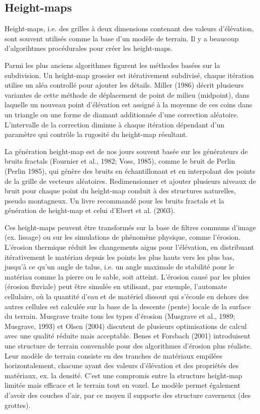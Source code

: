 \documentclass[11pt]{article}
\begin{document}
\subsection{Height-maps}

Height-maps, i.e. des grilles à deux dimensions contenant des valeurs d'élévation, sont souvent utilisés comme la base d'un modèle de terrain. Il y a beaucoup d'algorihtmes procédurales pour créer les height-maps. \newline

Parmi les plus anciens algorithmes figurent les méthodes basées sur la subdivision. Un height-map grossier est itérativement subdivisé, chaque itération utilise un aléa controllé pour ajouter les détails. Miller (1986) décrit plusieurs variantes de cette méthode de déplacement de point de milieu (midpoint), dans laquelle un nouveau point d'élévation est assigné à la moyenne de ces coins dans un triangle ou une forme de diamant additionnée d'une correction aléatoire. L'intervalle de la correction diminue à chaque itération dépendant d'un paramètre qui contrôle la rugosité du height-map résultant. \newline

La génération height-map est de nos jours souvent basée sur les générateurs de bruits fractals (Fournier et al., 1982; Voss, 1985), comme le bruit de Perlin (Perlin 1985), qui génère des bruits en échantillonant et en interpolant des points de la grille de vecteurs aléatoires. Redimensionner et ajouter plusieurs niveaux de bruit pour chaque point du height-map conduit à des structures naturelles, pseudo montagneux. Un livre recommandé pour les bruits fractals et la génération de height-map et celui d'Ebert et al. (2003).\newline

Ces height-maps peuvent être transformés sur la base de filtres  communs d'image (ex. lissage) ou sur les simulations de phénomène physique, comme l'érosion. L'érosion thermique réduit les changements aigus pour l'élévation, en distribuant itérativement le matériau depuis les points les plus hauts vers les plus bas, jusqu'à ce qu'un angle de talus, i.e. un angle maximale de stabilité pour le matériau comme la pierre ou le sable, soit atteint. L'érosion causé par les pluies (érosion fluviale) peut être simulée en utilisant, par exemple, l'automate cellulaire, où la quantité d'eau et de matériel dissout qui s'écoule en dehors des  autres cellules est calculée sur la base de la descente (pente) locale de la surface du terrain. Musgrave traite tous les types d'érosion (Musgrave et al., 1989; Musgrave, 1993) et Olsen (2004) discutent de plusieurs optimisations de calcul avec une qualité réduite mais acceptable. Benes et Forsbach (2001) introduisent une structure de terrain convenable pour des algorithmes d'érosion plus réaliste. Leur modèle de terrain consiste en des tranches de matériaux empilées horizontalement, chacune ayant des valeurs d'élévation et des propriétés des matériaux, ex. la densité. C'est une compromis entre la structure height-map limitée mais efficace et le terrain tout en voxel. Le modèle permet également d'avoir des couches d'air, par ce moyen il supporte des structure caverneux (des grottes). \newline
\end{document}
